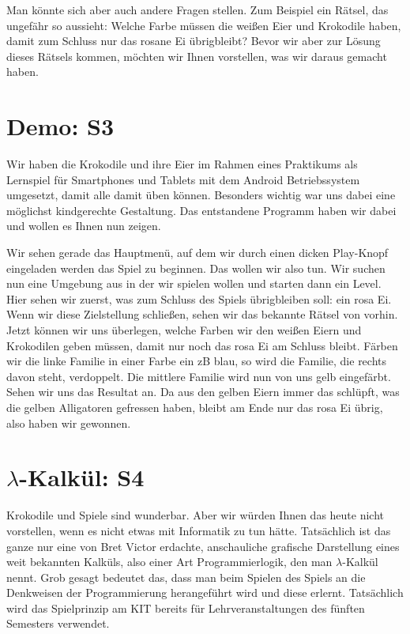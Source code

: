 \documentclass{scrartcl}
\begin{document}
	Man könnte sich aber auch andere Fragen stellen.
	Zum Beispiel ein Rätsel, das ungefähr so aussieht:
	Welche Farbe müssen die weißen Eier und Krokodile haben, damit zum Schluss nur das rosane Ei übrigbleibt?
	Bevor wir aber zur Lösung dieses Rätsels kommen, möchten wir Ihnen vorstellen, was wir daraus gemacht haben.


	\section{Demo: S3}
	Wir haben die Krokodile und ihre Eier im Rahmen eines Praktikums als Lernspiel für Smartphones und Tablets mit dem Android Betriebssystem umgesetzt, damit alle damit üben können.
	Besonders wichtig war uns dabei eine möglichst kindgerechte Gestaltung.
	Das entstandene Programm haben wir dabei und wollen es Ihnen nun zeigen.

	Wir sehen gerade das Hauptmenü, auf dem wir durch einen dicken Play-Knopf eingeladen werden das Spiel zu beginnen.
	Das wollen wir also tun.
	Wir suchen nun eine Umgebung aus in der wir spielen wollen und starten dann ein Level.
	Hier sehen wir zuerst, was zum Schluss des Spiels übrigbleiben soll: ein rosa Ei.
	Wenn wir diese Zielstellung schließen, sehen wir das bekannte Rätsel von vorhin.
	Jetzt können wir uns überlegen, welche Farben wir den weißen Eiern und Krokodilen geben müssen, damit nur noch das rosa Ei am Schluss bleibt.
	Färben wir die linke Familie in einer Farbe ein zB blau, so wird die Familie, die rechts davon steht, verdoppelt.
	Die mittlere Familie wird nun von uns gelb eingefärbt.
	Sehen wir uns das Resultat an.
	Da aus den gelben Eiern immer das schlüpft, was die gelben Alligatoren gefressen haben, bleibt am Ende nur das rosa Ei übrig, also haben wir gewonnen. 
	
	
	

	\section{$\lambda$-Kalkül: S4}
	Krokodile und Spiele sind wunderbar.
	Aber wir würden Ihnen das heute nicht vorstellen, wenn es nicht etwas mit Informatik zu tun hätte.
	Tatsächlich ist das ganze nur eine von Bret Victor erdachte, anschauliche grafische Darstellung eines weit bekannten Kalküls, also einer Art Programmierlogik, den man $\lambda$-Kalkül nennt.
	Grob gesagt bedeutet das, dass man beim Spielen des Spiels an die Denkweisen der Programmierung herangeführt wird und diese erlernt.
	Tatsächlich wird das Spielprinzip am KIT bereits für Lehrveranstaltungen des fünften Semesters verwendet.
\end{document}
